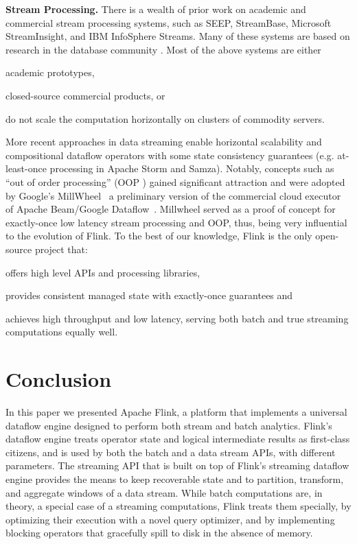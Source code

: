\documentclass[11pt]{article}
\newcommand{\para}[1]{\vspace{2mm}\noindent\textbf{#1}}
\begin{document}
\para{Stream Processing.} There is a wealth of prior work on academic and commercial stream processing systems, such as SEEP, StreamBase, Microsoft StreamInsight, and IBM InfoSphere Streams. Many of these systems are based on research in the database community \cite{chandrasekaran2003psoup,abadi2005design,arasu2004stream,chandramouli2014trill,gedik2008spade,migliavacca2010seep}. Most of the above systems are either
\begin{inparaenum}[i)]
  \item academic prototypes,
  \item closed-source commercial products, or 
  \item do not scale the computation horizontally on clusters of commodity servers.
\end{inparaenum}
More recent approaches in data streaming enable horizontal scalability and compositional dataflow operators with some state consistency guarantees (e.g. at-least-once processing in Apache Storm and Samza). Notably, concepts such as ``out of order processing'' (OOP \cite{li2008out}) gained significant attraction and were adopted by Google's MillWheel~\cite{akidau2013millwheel} a preliminary version of the commercial cloud executor of Apache Beam/Google Dataflow~\cite{akidau2015dataflow}. Millwheel served as a proof of concept for exactly-once low latency stream processing and OOP, thus, being very influential to the evolution of Flink. To the best of our knowledge, Flink is the only open-source project that:
\begin{inparaenum}[i)]
  \item offers high level APIs and processing libraries,
  \item provides consistent managed state with exactly-once guarantees and
  \item achieves high throughput and low latency, serving both batch and true streaming computations equally well.
\end{inparaenum}

\vspace{-3mm}
\section{Conclusion}
\label{sec:conclusions}
In this paper we presented Apache Flink, a platform that implements a universal dataflow engine designed to perform both stream and batch analytics. Flink's dataflow engine treats operator state and logical intermediate results as first-class citizens, and is used by both the batch and a data stream APIs, with different parameters. The streaming API that is built on top of  Flink's streaming dataflow engine provides the means to keep recoverable state and to partition, transform, and aggregate windows of a data stream. While batch computations are, in theory, a special case of a streaming computations, Flink treats them specially, by optimizing their execution with a novel query optimizer, and by implementing blocking operators that gracefully spill to disk in the absence of memory. 

{
\small


}
\end{document}
